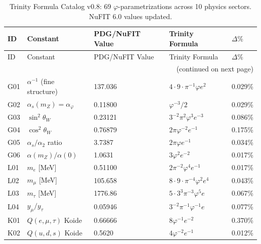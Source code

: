 \documentclass[10pt,a4paper]{article}
\begin{document}
\begin{longtable}{@{}lllll@{}}
\caption{Trinity Formula Catalog v0.8: 69 $\varphi$-parametrizations across 10 physics sectors. NuFIT 6.0 values updated.}
\label{tab:catalog}\\
\toprule
ID & Constant & PDG/NuFIT Value & Trinity Formula & $\Delta\%$ \\
\midrule
\endfirsthead
\toprule
ID & Constant & PDG/NuFIT Value & Trinity Formula & $\Delta\%$ \\
\midrule
\endhead
\midrule\multicolumn{5}{r}{\small(continued on next page)}\\
\endfoot
\bottomrule
\endlastfoot
G01 & $\alpha^{-1}$ (fine structure)      & 137.036 & $4{\cdot}9{\cdot}\pi^{-1}\varphi e^2$              & 0.029\% \\
G02 & $\alpha_s(m_Z) = \alpha_\varphi$    & 0.11800  & $\varphi^{-3}/2$                                   & 0.029\% \\
G03 & $\sin^2\theta_W$                     & 0.23121  & $3^{-2}\pi^2\varphi^3 e^{-3}$                      & 0.086\% \\
G04 & $\cos^2\theta_W$                     & 0.76879  & $2\pi\varphi^{-2}e^{-1}$                           & 0.175\% \\
G05 & $\alpha_s/\alpha_2$ ratio            & 3.7387   & $2\pi\varphi e^{-1}$                               & 0.034\% \\
G06 & $\alpha(m_Z)/\alpha(0)$              & 1.0631   & $3\varphi^2 e^{-2}$                                & 0.017\% \\
\midrule
L01 & $m_e$ [MeV]                          & 0.51100  & $2\pi^{-2}\varphi^4 e^{-1}$                        & 0.017\% \\
L02 & $m_\mu$ [MeV]                        & 105.658  & $8{\cdot}9{\cdot}\pi^{-4}\varphi^2 e^4$            & 0.043\% \\
L03 & $m_\tau$ [MeV]                       & 1776.86  & $5{\cdot}3^3\pi^{-3}\varphi^5 e$                   & 0.067\% \\
L04 & $y_\mu/y_\tau$                       & 0.05946  & $3^{-2}\pi^{-1}\varphi^{-1}e$                      & 0.077\% \\
K01 & $Q(e,\mu,\tau)$ Koide                & 0.66666  & $8\varphi^{-1}e^{-2}$                              & 0.370\% \\
K02 & $Q(u,d,s)$ Koide                     & 0.5620   & $4\varphi^{-2}e^{-1}$                              & 0.012\% \\

\end{longtable}
\end{document}
